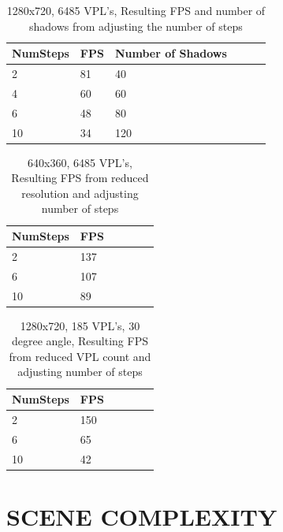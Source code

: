\begin{table}[h!]
	\caption{1280x720, 6485 VPL's, Resulting FPS and number of shadows from adjusting the number of steps}
	\begin{center}
	    \begin{tabular}{ | l | l | l | l | l | l |}
	    \hline
	    NumSteps & FPS & Number of Shadows\\ \hline
	    2 & 81 & 40\\ \hline
	    4 & 60 & 60\\ \hline
	    6 & 48 & 80\\ \hline
	    10 & 34 & 120\\ \hline
	    \end{tabular}
	\end{center}
	\label{table:secondAppResults1}
\end{table}

\begin{table}[h!]
	\caption{640x360, 6485 VPL's, Resulting FPS from reduced resolution and adjusting number of steps}
	\begin{center}
	    \begin{tabular}{ | l | l | l | l | l | l |}
	    \hline
	    NumSteps & FPS\\ \hline
	    2 & 137\\ \hline
	    6 & 107\\ \hline
	    10 & 89\\ \hline
	    \end{tabular}
	\end{center}
	\label{table:secondAppResults2}
\end{table}

\begin{table}[h!]
	\caption{1280x720, 185 VPL's, 30 degree angle, Resulting FPS from reduced VPL count and adjusting number of steps}
	\begin{center}
	    \begin{tabular}{ | l | l | l | l | l | l |}
	    \hline
	    NumSteps & FPS\\ \hline
	    2 & 150\\ \hline
	    6 & 65\\ \hline
	    10 & 42\\ \hline
	    \end{tabular}
	\end{center}
	\label{table:secondAppResults3}
\end{table}

\section{SCENE COMPLEXITY}

